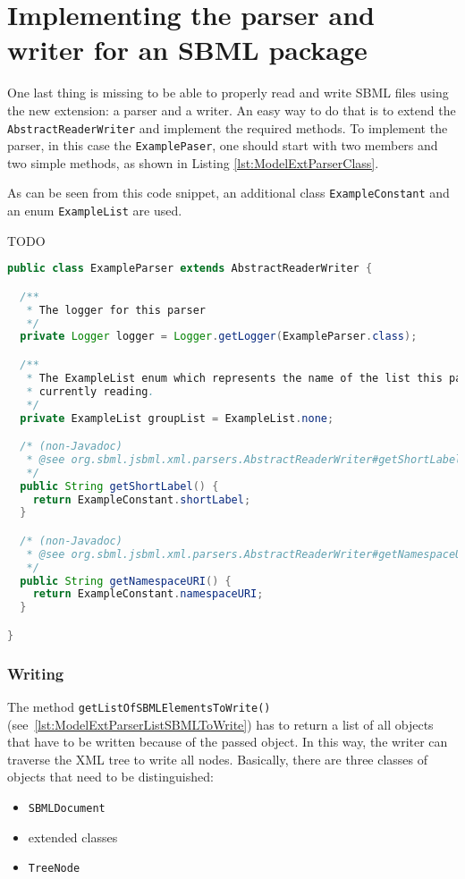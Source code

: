\section{Implementing the parser and writer for an SBML package}

One last thing is missing to be able to properly read and write SBML files
using the new extension: a parser and a writer. An easy way to do that is to
extend the \texttt{AbstractReaderWriter} and implement the required methods. To
implement the parser, in this case the \texttt{ExamplePaser}, one should start with two members and two simple methods, as shown in Listing \ref{lst:ModelExtParserClass}.

As can be seen from this code snippet, an additional class
\texttt{ExampleConstant} and an enum \texttt{ExampleList} are used.

TODO


\begin{lstlisting}[language=Java,caption={The first part of the parser for the extension},label={lst:ModelExtParserClass}]
public class ExampleParser extends AbstractReaderWriter {

  /**
   * The logger for this parser
   */
  private Logger logger = Logger.getLogger(ExampleParser.class);

  /**
   * The ExampleList enum which represents the name of the list this parser is
   * currently reading.
   */
  private ExampleList groupList = ExampleList.none;

  /* (non-Javadoc)
   * @see org.sbml.jsbml.xml.parsers.AbstractReaderWriter#getShortLabel()
   */
  public String getShortLabel() {
    return ExampleConstant.shortLabel;
  }

  /* (non-Javadoc)
   * @see org.sbml.jsbml.xml.parsers.AbstractReaderWriter#getNamespaceURI()
   */
  public String getNamespaceURI() {
    return ExampleConstant.namespaceURI;
  }

}
\end{lstlisting}


\subsubsection{Writing}

The method \texttt{getListOfSBMLElementsToWrite()}
(see~\vref{lst:ModelExtParserListSBMLToWrite}) has to return a list of all
objects that have to be written because of the passed object.
In this way, the writer can traverse the XML tree to write all nodes.
Basically, there are three classes of objects that need to be distinguished:
\begin{itemize}
 \item \texttt{SBMLDocument}
 \item extended classes
 \item \texttt{TreeNode}
\end{itemize}

